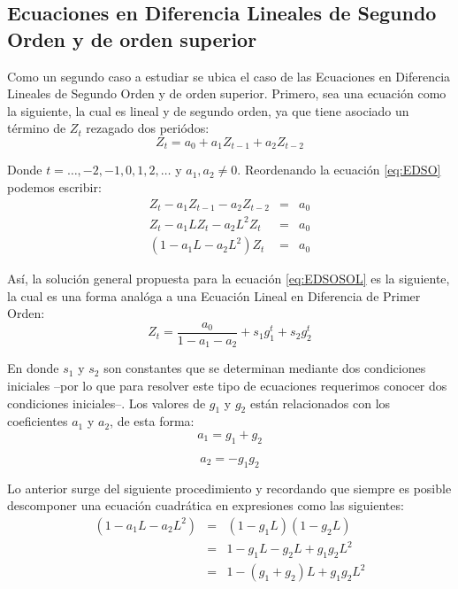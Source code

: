 \documentclass[
]{book}
\begin{document}
\hypertarget{ecuaciones-en-diferencia-lineales-de-segundo-orden-y-de-orden-superior}{%
\subsection{Ecuaciones en Diferencia Lineales de Segundo Orden y de orden superior}\label{ecuaciones-en-diferencia-lineales-de-segundo-orden-y-de-orden-superior}}

Como un segundo caso a estudiar se ubica el caso de las Ecuaciones en Diferencia Lineales de Segundo Orden y de orden superior. Primero, sea una ecuación como la siguiente, la cual es lineal y de segundo orden, ya que tiene asociado un término de \(Z_t\) rezagado dos periódos:
\begin{equation}
    Z_t = a_0 + a_1 Z_{t-1} + a_2 Z_{t-2}
    \label{eq:EDSO}
\end{equation}

Donde \(t = \ldots, -2, -1, 0, 1, 2, \ldots\) y \(a_1, a_2 \neq 0\). Reordenando la ecuación \eqref{eq:EDSO} podemos escribir:
\begin{eqnarray}
    Z_t - a_1 Z_{t-1} - a_2 Z_{t-2} & = & a_0 \nonumber \\
    Z_t - a_1 L Z_{t} - a_2 L^2 Z_{t} & = & a_0 \nonumber \\
    (1 - a_1 L - a_2 L^2)Z_t & = & a_0 
    \label{eq:EDSOSOL}
\end{eqnarray}

Así, la solución general propuesta para la ecuación \eqref{eq:EDSOSOL} es la siguiente, la cual es una forma analóga a una Ecuación Lineal en Diferencia de Primer Orden:
\begin{equation}
    Z_t = \frac{a_0}{1 - a_1 - a_2} + s_1 g^t_1 + s_2 g^t_2
    \label{eq:SOLGEN2}
\end{equation}

En donde \(s_1\) y \(s_2\) son constantes que se determinan mediante dos condiciones iniciales --por lo que para resolver este tipo de ecuaciones requerimos conocer dos condiciones iniciales--. Los valores de \(g_1\) y \(g_2\) están relacionados con los coeficientes \(a_1\) y \(a_2\), de esta forma:
\begin{equation}
  a_1  =  g_1 + g_2
  \label{eq:a1}
\end{equation}

\begin{equation}
    a_2  =  - g_1 g_2
    \label{eq:a2}
\end{equation}

Lo anterior surge del siguiente procedimiento y recordando que siempre es posible descomponer una ecuación cuadrática en expresiones como las siguientes:
\begin{eqnarray}
    (1 - a_1 L - a_2 L^2) & = & (1 - g_1 L)(1 - g_2 L) \nonumber \\
    & = & 1 - g_1 L - g_2 L + g_1 g_2 L^2 \nonumber \\
    & = & 1 - (g_1 + g_2) L + g_1 g_2 L^2
    \label{eq:eqcaracteristica}
\end{eqnarray}
\end{document}
